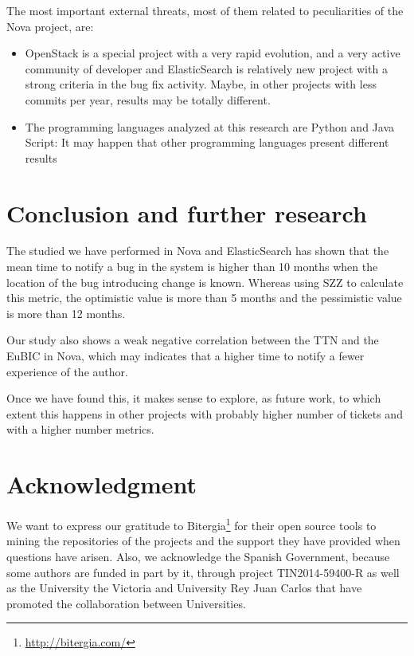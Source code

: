 \documentclass[10pt, conference]{IEEEtran}
\begin{document}
The most important external threats, most of them related to peculiarities of the Nova project, are:

\begin{itemize}
    \item OpenStack is a special project with a very rapid evolution, and a very active community of developer and ElasticSearch is relatively new project with a strong criteria in the bug fix activity. Maybe, in other projects with less commits per year, results may be totally different.
    \item The programming languages analyzed at this research are Python and Java Script: It may happen that other programming languages present different results
\end{itemize}

\section{Conclusion and further research}
\label{sec:conclusions}

The studied we have performed in Nova and ElasticSearch has shown that the mean time to notify a bug in the system is higher than 10 months when the location of the bug introducing change is known. Whereas using SZZ to calculate this metric, the optimistic value is more than 5 months and the pessimistic value is more than 12 months. 

Our study also shows a weak negative correlation between the TTN and the EuBIC in Nova, which may indicates that a higher time to notify a fewer experience of the author. 

Once we have found this, it makes sense to explore, as future work, to which extent this happens in other projects with probably higher number of tickets and with a higher number metrics.

\section*{Acknowledgment}


We want to express our gratitude to Bitergia\footnote{\url{http://bitergia.com/}} for their open source tools to mining the repositories of the projects and the support they have provided when questions have arisen. Also, we acknowledge the Spanish Government, because some authors are funded in part by it, through project TIN2014-59400-R as well as the University the Victoria and University Rey Juan Carlos that have promoted the collaboration between Universities.
\end{document}
